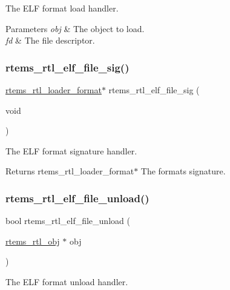 The E\+LF format load handler.


\begin{DoxyParams}{Parameters}
{\em obj} & The object to load. \\
\hline
{\em fd} & The file descriptor. \\
\hline
\end{DoxyParams}
\mbox{\label{rtl-elf_8h_a89a86f305b09923b92f18b72a5478427}} 
\subsubsection{\texorpdfstring{rtems\_rtl\_elf\_file\_sig()}{rtems\_rtl\_elf\_file\_sig()}}
{\footnotesize\ttfamily \mbox{\hyperlink{structrtems__rtl__loader__format}{rtems\+\_\+rtl\+\_\+loader\+\_\+format}}$\ast$ rtems\+\_\+rtl\+\_\+elf\+\_\+file\+\_\+sig (\begin{DoxyParamCaption}\item[{void}]{ }\end{DoxyParamCaption})}

The E\+LF format signature handler.

\begin{DoxyReturn}{Returns}
rtems\+\_\+rtl\+\_\+loader\+\_\+format$\ast$ The format\textquotesingle{}s signature. 
\end{DoxyReturn}
\mbox{\label{rtl-elf_8h_a11980d1727cffdcc360b8f2d02e836df}} 
\subsubsection{\texorpdfstring{rtems\_rtl\_elf\_file\_unload()}{rtems\_rtl\_elf\_file\_unload()}}
{\footnotesize\ttfamily bool rtems\+\_\+rtl\+\_\+elf\+\_\+file\+\_\+unload (\begin{DoxyParamCaption}\item[{\mbox{\hyperlink{structrtems__rtl__obj}{rtems\+\_\+rtl\+\_\+obj}} $\ast$}]{obj }\end{DoxyParamCaption})}

The E\+LF format unload handler.


